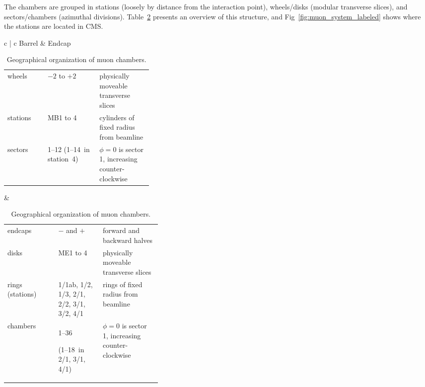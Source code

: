 \documentclass[12pt]{article}
\renewcommand{\arraystretch}{1.25}
\begin{document}
The chambers are grouped in stations (loosely by distance from the
interaction point), wheels/disks (modular transverse slices), and
sectors/chambers (azimuthal divisions).  Table~\ref{tab:geometry} presents an
overview of this structure, and Fig~\ref{fig:muon_system_labeled}
shows where the stations are located in CMS.

\begin{table}
\caption{Geographical organization of muon chambers. \label{tab:geometry}}
\begin{center}
\begin{tabular}{c | c}
Barrel & Endcap \\\hline
\renewcommand{\arraystretch}{2.5}
\begin{tabular}{p{0.08\linewidth} p{0.125\linewidth} p{0.13\linewidth}}
wheels & $-2$ to $+2$ & physically moveable transverse slices \\
stations & MB1 to 4 & cylinders of fixed radius from beamline \\
sectors & 1--12 \mbox{(1--14 in} station~4) & \raggedright $\phi=0$ is sector 1, increasing counter-clockwise \\
\end{tabular} &
\begin{tabular}{p{0.1\linewidth} p{0.125\linewidth} p{0.14\linewidth}}
endcaps & $-$ and $+$ & forward and backward halves \\
disks & ME1 to 4 & physically moveable transverse slices \\
rings \mbox{(stations)} & \raggedright 1/1ab, 1/2, 1/3, 2/1, 2/2, 3/1, 3/2, 4/1 & rings of fixed radius from beamline \\
chambers & 1--36 \raggedright \mbox{(1--18 in} 2/1, 3/1, 4/1) & \raggedright $\phi=0$ is sector 1, increasing counter-clockwise \\
\end{tabular}
\vspace{-1 cm}
\end{tabular}
\end{center}
\end{table}
\end{document}
